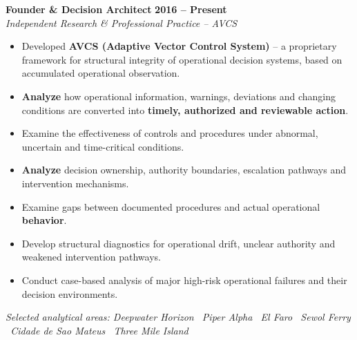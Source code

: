 \documentclass[11pt,a4paper]{article}
\begin{document}
\textbf{\color{avcsdark}Founder \& Decision Architect} \hfill \textbf{\color{avcsgray}2016 -- Present} \\
\textit{Independent Research \& Professional Practice -- AVCS} \\
\vspace{2pt}
\begin{itemize}[leftmargin=*, nosep, itemsep=2pt]
    \item Developed \textbf{AVCS (Adaptive Vector Control System)} -- a proprietary framework for structural integrity of operational decision systems, based on accumulated operational observation.
    \item \textbf{Analyze} how operational information, warnings, deviations and changing conditions are converted into \textbf{timely, authorized and reviewable action}.
    \item Examine the effectiveness of controls and procedures under abnormal, uncertain and time-critical conditions.
    \item \textbf{Analyze} decision ownership, authority boundaries, escalation pathways and intervention mechanisms.
    \item Examine gaps between documented procedures and actual operational \textbf{behavior}.
    \item Develop structural diagnostics for operational drift, unclear authority and weakened intervention pathways.
    \item Conduct case-based analysis of major high-risk operational failures and their decision environments.
\end{itemize}

\vspace{4pt}
\textit{Selected analytical areas: Deepwater Horizon \textbar\ Piper Alpha \textbar\ El Faro \textbar\ Sewol Ferry \textbar\ Cidade de Sao Mateus \textbar\ Three Mile Island}

\vspace{8pt}
\end{document}
